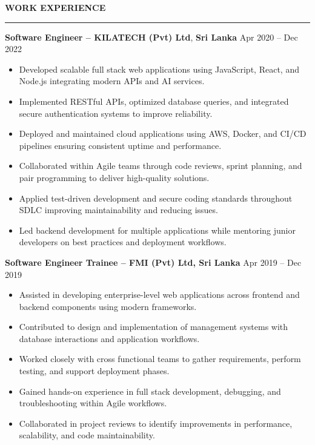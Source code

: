 \documentclass[10pt,letterpaper]{article}
\begin{document}
\textbf{WORK EXPERIENCE}\\[-8pt]
\noindent\rule{\textwidth}{1pt}

\vspace{-2pt}

\textbf{Software Engineer -- KILATECH (Pvt) Ltd}, \textbf{Sri Lanka} \hfill Apr 2020 -- Dec 2022

\vspace{-1pt}

\begin{itemize}
\item Developed scalable full stack web applications using JavaScript, React, and Node.js integrating modern APIs and AI services.
\item Implemented RESTful APIs, optimized database queries, and integrated secure authentication systems to improve reliability.
\item Deployed and maintained cloud applications using AWS, Docker, and CI/CD pipelines ensuring consistent uptime and performance.
\item Collaborated within Agile teams through code reviews, sprint planning, and pair programming to deliver high-quality solutions.
\item Applied test-driven development and secure coding standards throughout SDLC improving maintainability and reducing issues.
\item Led backend development for multiple applications while mentoring junior developers on best practices and deployment workflows.
\end{itemize}

\textbf{Software Engineer Trainee -- FMI (Pvt) Ltd, Sri Lanka} \hfill Apr 2019 -- Dec 2019

\vspace{-1pt}

\begin{itemize}
\item Assisted in developing enterprise-level web applications across frontend and backend components using modern frameworks.
\item Contributed to design and implementation of management systems with database interactions and application workflows.
\item Worked closely with cross functional teams to gather requirements, perform testing, and support deployment phases.
\item Gained hands-on experience in full stack development, debugging, and troubleshooting within Agile workflows.
\item Collaborated in project reviews to identify improvements in performance, scalability, and code maintainability.
\end{itemize}
\end{document}
